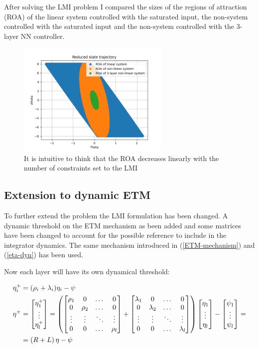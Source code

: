 \documentclass{article}
\begin{document}
After solving the LMI problem I compared the sizes of the regions of attraction (ROA) of the linear system controlled with the saturated input, the non-system controlled with the saturated input and the non-system controlled with the 3-layer NN controller. 


\begin{figure}[H]
    \centering
    \includegraphics[width=0.65\textwidth]{ROA_comparison}
    \caption{It is intuitive to think that the ROA decreases linearly with the number of constraints set to the LMI}
\end{figure}

\subsection*{Extension to dynamic ETM}
To further extend the problem the LMI formulation has been changed. A dynamic threshold on the ETM mechanism as been added and some matrices have been changed to account for the possible reference to include in the integrator dynamics. 
The same mechanism introduced in (\ref{ETM-mechanism}) and (\ref{eta-dyn}) has been used. 

Now each layer will have its own dynamical threshold:

\begin{align*}
  \eta_i^{+} &= (\rho_{i} + \lambda_{i}) \eta_i - \psi \\
  \eta^{+} &= \left[\begin{matrix}
    \eta_1^{+} \\
    \vdots \\
    \eta_l^{+}
  \end{matrix}\right] = \left( \left[\begin{matrix}
    \rho_1 & 0 & \dots & 0\\
    0 & \rho_2 & \dots & 0\\
    \vdots & \vdots & \ddots & \vdots\\
    0 & 0 & \dots & \rho_l
  \end{matrix}\right] + \left[\begin{matrix}
    \lambda_1 & 0 & \dots & 0\\
    0 & \lambda_2 & \dots & 0\\
    \vdots & \vdots & \ddots & \vdots\\
    0 & 0 & \dots & \lambda_l
  \end{matrix}\right]\right) \left[\begin{matrix}
    \eta_1 \\
    \vdots \\
    \eta_l
  \end{matrix}\right] - \left[\begin{matrix}
    \psi_1 \\
    \vdots \\
    \psi_l
  \end{matrix}\right] = \\
  &= \left( R + L \right) \eta - \psi
\end{align*}
\end{document}
